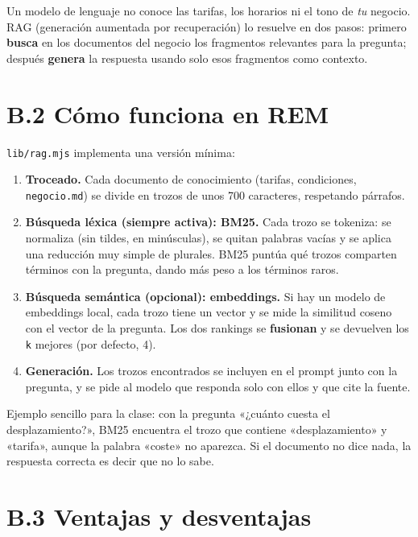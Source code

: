 Un modelo de lenguaje no conoce las tarifas, los horarios ni el tono de \emph{tu} negocio. RAG (generación aumentada por recuperación) lo resuelve en dos pasos: primero \textbf{busca} en los documentos del negocio los fragmentos relevantes para la pregunta; después \textbf{genera} la respuesta usando solo esos fragmentos como contexto.

\section{B.2 Cómo funciona en REM}\label{b.2-cuxf3mo-funciona-en-rem}

\texttt{lib/rag.mjs} implementa una versión mínima:

\begin{enumerate}
\def\labelenumi{\arabic{enumi}.}
\tightlist
\item
  \textbf{Troceado.} Cada documento de conocimiento (tarifas, condiciones, \texttt{negocio.md}) se divide en trozos de unos 700 caracteres, respetando párrafos.
\item
  \textbf{Búsqueda léxica (siempre activa): BM25.} Cada trozo se tokeniza: se normaliza (sin tildes, en minúsculas), se quitan palabras vacías y se aplica una reducción muy simple de plurales. BM25 puntúa qué trozos comparten términos con la pregunta, dando más peso a los términos raros.
\item
  \textbf{Búsqueda semántica (opcional): embeddings.} Si hay un modelo de embeddings local, cada trozo tiene un vector y se mide la similitud coseno con el vector de la pregunta. Los dos rankings se \textbf{fusionan} y se devuelven los \texttt{k} mejores (por defecto, 4).
\item
  \textbf{Generación.} Los trozos encontrados se incluyen en el prompt junto con la pregunta, y se pide al modelo que responda solo con ellos y que cite la fuente.
\end{enumerate}

Ejemplo sencillo para la clase: con la pregunta «¿cuánto cuesta el desplazamiento?», BM25 encuentra el trozo que contiene «desplazamiento» y «tarifa», aunque la palabra «coste» no aparezca. Si el documento no dice nada, la respuesta correcta es decir que no lo sabe.

\section{B.3 Ventajas y desventajas}\label{b.3-ventajas-y-desventajas}

